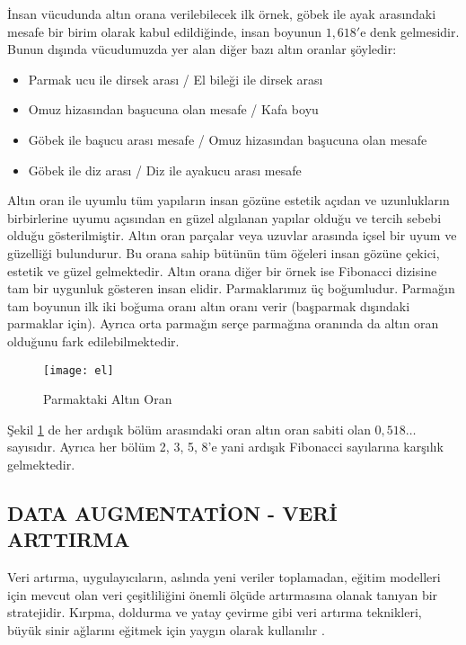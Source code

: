 \documentclass[11pt,a4paper]{report}
\begin{document}
\begin{justify}
 		İnsan vücudunda altın orana verilebilecek ilk örnek, göbek ile ayak arasındaki mesafe bir birim olarak kabul edildiğinde, insan boyunun $1,618'$e denk gelmesidir. Bunun dışında vücudumuzda yer alan diğer bazı altın oranlar şöyledir:
 		
 		\begin{itemize}
 			\item Parmak ucu ile dirsek arası / El bileği ile dirsek arası
 			\item Omuz hizasından başucuna olan mesafe / Kafa boyu
 			\item Göbek ile başucu arası mesafe / Omuz hizasından başucuna olan mesafe
 			\item Göbek ile diz arası / Diz ile ayakucu arası mesafe
 		\end{itemize}
 		
 		Altın oran ile uyumlu tüm yapıların insan gözüne estetik açıdan ve uzunlukların birbirlerine uyumu açısından en güzel algılanan yapılar olduğu ve tercih sebebi olduğu gösterilmiştir. Altın oran parçalar veya uzuvlar arasında içsel bir uyum ve güzelliği bulundurur. Bu orana sahip bütünün tüm öğeleri insan gözüne çekici, estetik ve güzel gelmektedir. Altın orana diğer bir örnek ise Fibonacci dizisine tam bir uygunluk gösteren insan elidir. Parmaklarımız üç boğumludur. Parmağın tam boyunun ilk iki boğuma oranı altın oranı verir (başparmak dışındaki parmaklar için). Ayrıca orta parmağın serçe parmağına oranında da altın oran olduğunu fark edilebilmektedir.
 		
 		\begin{figure}[!h]
 			\centering
 			\texttt{[image: el]}
 			\caption{Parmaktaki Altın Oran}
 			\label{el}
 		\end{figure}
 		
 		
 		
 		Şekil \ref{el} de her ardışık bölüm arasındaki oran altın oran sabiti olan $0,518\ldots$ sayısıdır. Ayrıca her bölüm 2, 3, 5, 8'e yani ardışık Fibonacci sayılarına karşılık gelmektedir.
 		
  \subsection{DATA AUGMENTATİON - VERİ ARTTIRMA}
 		Veri artırma, uygulayıcıların, aslında yeni veriler toplamadan, eğitim modelleri için mevcut olan veri çeşitliliğini önemli ölçüde artırmasına olanak tanıyan bir stratejidir. Kırpma, doldurma ve yatay çevirme gibi veri artırma teknikleri, büyük sinir ağlarını eğitmek için yaygın olarak kullanılır \cite{Augmentation1}. 
 	\newline
 	

\end{justify}
\end{document}
